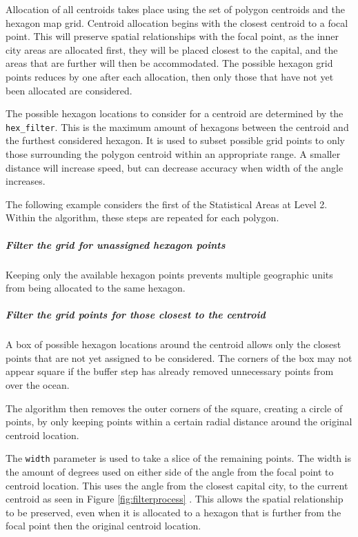 Allocation of all centroids takes place using the set of polygon
centroids and the hexagon map grid. Centroid allocation begins with the
closest centroid to a focal point. This will preserve spatial
relationships with the focal point, as the inner city areas are
allocated first, they will be placed closest to the capital, and the
areas that are further will then be accommodated. The possible hexagon
grid points reduces by one after each allocation, then only those that
have not yet been allocated are considered.

The possible hexagon locations to consider for a centroid are determined
by the \texttt{hex\_filter}. This is the maximum amount of hexagons
between the centroid and the furthest considered hexagon. It is used to
subset possible grid points to only those surrounding the polygon
centroid within an appropriate range. A smaller distance will increase
speed, but can decrease accuracy when width of the angle increases.

The following example considers the first of the Statistical Areas at
Level 2. Within the algorithm, these steps are repeated for each
polygon.

\hypertarget{filter-the-grid-for-unassigned-hexagon-points}{%
\subparagraph{Filter the grid for unassigned hexagon
points}\label{filter-the-grid-for-unassigned-hexagon-points}}

Keeping only the available hexagon points prevents multiple geographic
units from being allocated to the same hexagon.

\hypertarget{filter-the-grid-points-for-those-closest-to-the-centroid}{%
\subparagraph{Filter the grid points for those closest to the
centroid}\label{filter-the-grid-points-for-those-closest-to-the-centroid}}

A box of possible hexagon locations around the centroid allows only the
closest points that are not yet assigned to be considered. The corners
of the box may not appear square if the buffer step has already removed
unnecessary points from over the ocean.

The algorithm then removes the outer corners of the square, creating a
circle of points, by only keeping points within a certain radial
distance around the original centroid location.

The \texttt{width} parameter is used to take a slice of the remaining
points. The width is the amount of degrees used on either side of the
angle from the focal point to centroid location. This uses the angle
from the closest capital city, to the current centroid as seen in Figure
\ref{fig:filterprocess} . This allows the spatial relationship to be
preserved, even when it is allocated to a hexagon that is further from
the focal point then the original centroid location.


